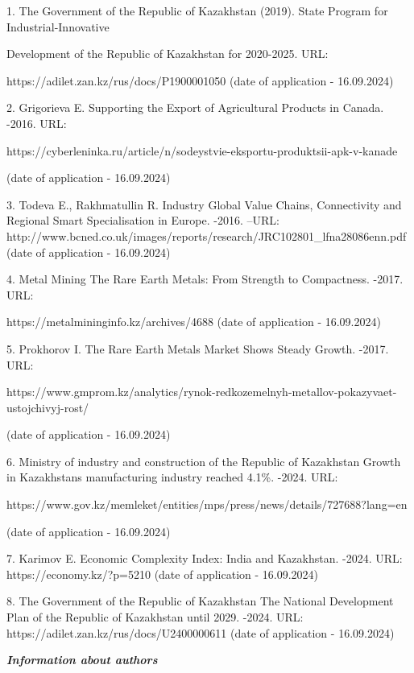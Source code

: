 \begin{noparindent}
1.
The Government of the Republic of Kazakhstan (2019). State Program for
Industrial-Innovative

Development of the Republic of Kazakhstan for
2020-2025. URL:

https://adilet.zan.kz/rus/docs/P1900001050 (date of
application - 16.09.2024)

2.
Grigorieva E. Supporting the Export of Agricultural Products in
Canada. -2016. URL:

https://cyberleninka.ru/article/n/sodeystvie-eksportu-produktsii-apk-v-kanade

(date of application - 16.09.2024)

3.
Todeva E., Rakhmatullin R. Industry Global Value Chains, Connectivity
and Regional Smart Specialisation in Europe. -2016. --URL:
http://www.bcned.co.uk/images/reports/research/JRC102801\_lfna28086enn.pdf
(date of application - 16.09.2024)

4.
Metal Mining The Rare Earth Metals: From Strength to Compactness.
-2017. URL:

https://metalmininginfo.kz/archives/4688 (date of
application - 16.09.2024)

5.
Prokhorov I. The Rare Earth Metals Market Shows Steady Growth. -2017.
URL:

https://www.gmprom.kz/analytics/rynok-redkozemelnyh-metallov-pokazyvaet-ustojchivyj-rost/

(date of application - 16.09.2024)

6.
Ministry of industry and construction of the Republic of Kazakhstan
Growth in Kazakhstan\textquotesingle s manufacturing industry reached
4.1\%. -2024. URL:

https://www.gov.kz/memleket/entities/mps/press/news/details/727688?lang=en

(date of application - 16.09.2024)

7.
Karimov E. Economic Complexity Index: India and Kazakhstan. -2024.
URL: https://economy.kz/?p=5210 (date of application - 16.09.2024)

8.
The Government of the Republic of Kazakhstan The National Development
Plan of the Republic of Kazakhstan until 2029. -2024. URL:
https://adilet.zan.kz/rus/docs/U2400000611 (date of application -
16.09.2024)
\end{noparindent}

\emph{{\bfseries Information about authors}}

